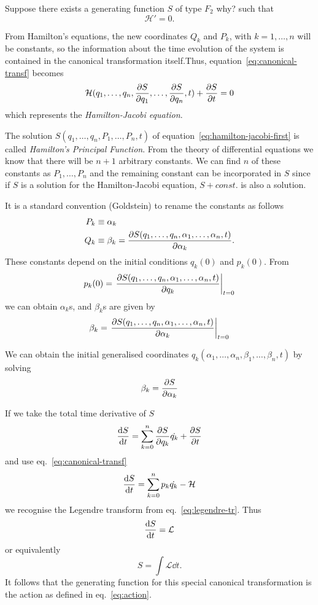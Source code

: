 \documentclass[../thesis.tex]{subfiles}
\theoremstyle{plain}
\begin{document}
Suppose there exists a generating function \(S\) of type \(F_2\) {\color{red}why?} such that
\[
  \mathcal{H'} = 0.
\]

From Hamilton's equations, the new coordinates \(Q_k\) and \(P_k\), with \(k=1,\dotsc,n\) will
be constants, so the information about the time evolution of the system is contained
in the canonical transformation itself.Thus, equation~\eqref{eq:canonical-transf} becomes
\begin{equation}
  \label{eq:hamilton-jacobi-first}
  \mathcal{H}(q_1,\dotsc,q_n,\pdv{S}{q_1},\dotsc,\pdv{S}{q_n},t) + \pdv{S}{t} = 0
\end{equation}
which represents the \emph{Hamilton-Jacobi equation}.

The solution \(S(q_1,\dotsc,q_n,P_1,\dotsc,P_n,t)\) of
equation~\eqref{eq:hamilton-jacobi-first} is called \emph{Hamilton's Principal Function}.
From the theory of differential equations we know that there will be \(n+1\) arbitrary constants.
We can find \(n\) of these constants as \(P_1,\dotsc,P_n\) and the remaining constant can be
incorporated in \(S\) since if \(S\) is a solution for the Hamilton-Jacobi equation,
\(S+const.\) is also a solution.

It is a standard convention (Goldstein) to rename the constants as follows
\begin{align*}
  P_k &\equiv \alpha_k \\
  Q_k &\equiv \beta_k = \pdv{S(q_1,\dotsc,q_n,\alpha_1,\dotsc,\alpha_n,t)}{\alpha_k}.
\end{align*}
These constants depend on the initial conditions \(q_k(0)\) and \(p_k(0)\). From
\[
  p_k(0) = \eval{\pdv{S(q_1,\dotsc,q_n,\alpha_1,\dotsc,\alpha_n,t)}{q_k}}_{t=0}
\]
we can obtain \(\alpha_k\)s, and \(\beta_k\)s are given by
\[
  \beta_k = \eval{\pdv{S(q_1,\dotsc,q_n,\alpha_1,\dotsc,\alpha_n,t)}{\alpha_k}}_{t=0}
\]

We can obtain the initial generalised coordinates
\(q_k(\alpha_1,\dotsc,\alpha_n,\beta_1,\dotsc,\beta_n,t)\) by solving
\[
  \beta_k=\pdv{S}{\alpha_k}
\]

If we take the total time derivative of \(S\)
\[
  \dv{S}{t} = \sum_{k=0}^{n} \pdv{S}{q_k} \dot{q_k} + \pdv{S}{t}
\]
and use eq.~\eqref{eq:canonical-transf}
\[
  \dv{S}{t} = \sum_{k=0}^{n} p_k \dot{q_k} - \mathcal{H}
\]
we recognise the Legendre transform from eq.~\eqref{eq:legendre-tr}. Thus
\[
  \dv{S}{t} = \mathcal{L}
\]
or equivalently
\[
  S = \int \mathcal{L} \dd{t}.
\]
It follows that the generating function for this special canonical transformation
is the action as defined in eq.~\eqref{eq:action}.
\end{document}
